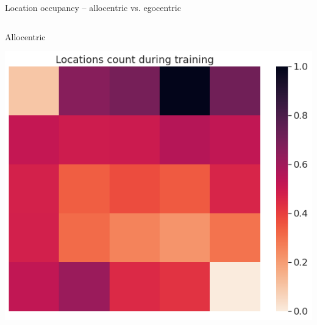 \documentclass[bigger]{beamer}
\begin{document}
\begin{frame}[label={sec:org2c2a3a1}]{Location occupancy -- allocentric vs. egocentric}
\begin{columns}
\begin{column}{0.5\columnwidth}
\footnotesize
\center
\vspace{-1em}
Allocentric
\vspace{-1em}
\begin{center}
\includegraphics[height=0.2\textheight]{img/q-learning_allo_locations_count_all_steps_all_cues.png}
\end{center}


\end{column}
\end{columns}
\end{frame}
\end{document}
